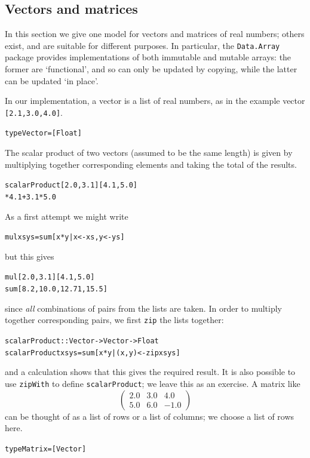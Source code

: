 \subsection*{Vectors and matrices}

In this section we give one model for vectors and matrices of real numbers;
others exist, and are suitable for different purposes. In particular, the \texttt{Data.Array} package provides implementations of both immutable and mutable arrays: the former are `functional', and so can only be updated by copying,  while the latter can be updated `in place'.

In our implementation, a vector is a list of real numbers, as in the example vector \texttt{[2.1,3.0,4.0]}. 
\begin{alltt}
type Vector = [Float]
\end{alltt}
The scalar product of
two vectors (assumed to be the same length) is given by multiplying together
corresponding elements and taking the total of the results.
\begin{alltt}
scalarProduct [2.0,3.1] [4.1,5.0] 
*4.1 + 3.1*5.0 
\end{alltt}
As a first attempt we might write
\begin{alltt}
mul xs ys = sum [ x*y | x<-xs , y<-ys ]
\end{alltt}
but this gives
\begin{alltt}
mul [2.0,3.1] [4.1,5.0] 
\step sum [8.2,10.0,12.71,15.5] 
\end{alltt}
since {\em all\/} combinations of pairs from the lists are taken. In order to
multiply together corresponding pairs, we first \texttt{zip} 
the lists together:
\begin{alltt}
scalarProduct :: Vector -> Vector -> Float
scalarProduct xs ys = sum [ x*y | (x,y) <- zip xs ys ]
\end{alltt}
and a calculation shows that this gives the required result. It is also
possible to use \texttt{zipWith} to define \texttt{scalarProduct}; we leave this as an exercise. A matrix like
\[ 
\left( \begin{array}{rrr} 2.0 & 3.0 & 4.0 \\ 5.0 & 6.0 & -1.0 \end{array} \right)
\]
can be
thought of as a list of rows or a list of columns; we choose a list of rows
here.
\begin{alltt}
type Matrix = [Vector]
\end{alltt}
